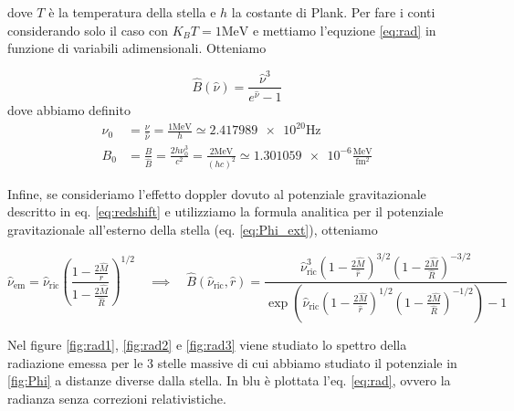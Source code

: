 \documentclass[a4paper, titlepage]{article}
\begin{document}
dove $T$ è la temperatura della stella e $h$ la costante di Plank.
Per fare i conti considerando solo il caso con $K_B T = 1
\unit{\mega\electronvolt}$ e mettiamo l'equzione \ref{eq:rad} in funzione di
variabili adimensionali. Otteniamo

\begin{equation}
    \hat B(\hat \nu) = \frac{\hat \nu ^3 }{e^{\hat \nu} - 1}
    \label{eq:B_ad}
\end{equation}
dove abbiamo definito
\begin{align}
    \nu_0 &= \frac{\nu}{\hat \nu} = \frac{1\unit{\mega\electronvolt}}{h} \simeq
    \num{2.417989e20} \unit{\hertz} \label{eq:B0def}\\
    B_0 &= \frac{B}{\hat B} = \frac{2 h \nu_0^3}{c^2}
    = \frac{2 \unit{\mega\electronvolt}}{(h c)^2} \simeq \num{1.301059e-6}
    \frac{\unit{\mega\electronvolt}}{\unit{\femto\meter\squared}}
    \label{eq:nu0def}
\end{align}

Infine, se consideriamo l'effetto doppler dovuto al potenziale gravitazionale
descritto in eq. \ref{eq:redshift} e utilizziamo la formula analitica per il
potenziale gravitazionale all'esterno della stella (eq. \ref{eq:Phi_ext}),
otteniamo

\begin{equation}
    \hat \nu_\text{em} = \hat \nu_\text{ric}
    \left(\frac{1 - \frac{2 \hat M}{r}}{1 - \frac{2 \hat M}{\hat R}}\right)^{1/2}
    \quad
    \implies
    \quad
    \hat B(\hat \nu_\text{ric}, \hat r) =
    \frac{\hat \nu_\text{ric}^3 \left(1 - \frac{2 \hat M}{\hat r}\right)^{3/2}
    \left(1 - \frac{2 \hat M}{\hat R}\right)^{-3/2} }
    {\exp( \hat \nu_\text{ric} \left(1 - \frac{2 \hat M}{\hat r} \right)^{1/2}
    \left(1 - \frac{2 \hat M}{\hat R}\right)^{-1/2} ) - 1}
    \label{eq:B_corr}
\end{equation}

Nel figure \ref{fig:rad1}, \ref{fig:rad2} e \ref{fig:rad3} viene studiato lo
spettro della radiazione emessa per le 3 stelle massive di cui abbiamo studiato
il potenziale in \ref{fig:Phi} a distanze diverse dalla stella.
In blu è plottata l'eq. \ref{eq:rad}, ovvero la radianza senza correzioni
relativistiche.
\end{document}
